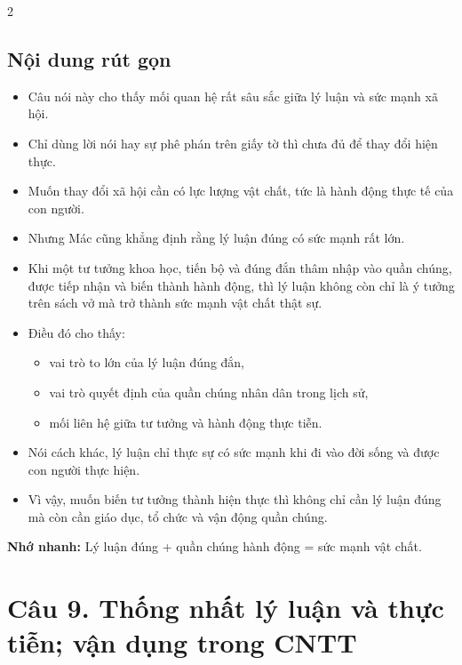 \documentclass[9pt,a4paper]{extarticle}
\begin{document}
\begin{multicols*}{2}
\subsection*{Nội dung rút gọn}
\begin{itemize}
  \item Câu nói này cho thấy mối quan hệ rất sâu sắc giữa lý luận và sức mạnh xã hội.
  \item Chỉ dùng lời nói hay sự phê phán trên giấy tờ thì chưa đủ để thay đổi hiện thực.
  \item Muốn thay đổi xã hội cần có lực lượng vật chất, tức là hành động thực tế của con người.
  \item Nhưng Mác cũng khẳng định rằng lý luận đúng có sức mạnh rất lớn.
  \item Khi một tư tưởng khoa học, tiến bộ và đúng đắn thâm nhập vào quần chúng, được tiếp nhận và biến thành hành động, thì lý luận không còn chỉ là ý tưởng trên sách vở mà trở thành sức mạnh vật chất thật sự.
  \item Điều đó cho thấy:
  \begin{itemize}
    \item vai trò to lớn của lý luận đúng đắn,
    \item vai trò quyết định của quần chúng nhân dân trong lịch sử,
    \item mối liên hệ giữa tư tưởng và hành động thực tiễn.
  \end{itemize}
  \item Nói cách khác, lý luận chỉ thực sự có sức mạnh khi đi vào đời sống và được con người thực hiện.
  \item Vì vậy, muốn biến tư tưởng thành hiện thực thì không chỉ cần lý luận đúng mà còn cần giáo dục, tổ chức và vận động quần chúng.
\end{itemize}

\textbf{Nhớ nhanh:} Lý luận đúng + quần chúng hành động = sức mạnh vật chất.

\section*{Câu 9. Thống nhất lý luận và thực tiễn; vận dụng trong CNTT}

\end{multicols*}
\end{document}

